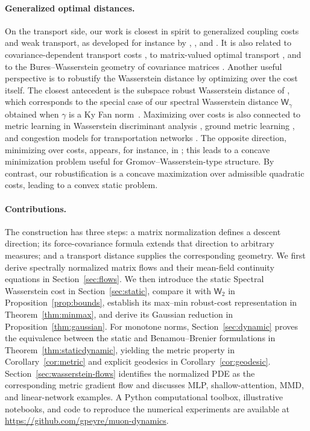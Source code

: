 \documentclass{article}
\newcommand{\Wtwo}{\mathsf{W}_2}
\newcommand{\Wg}{\mathsf{W}_{\gamma}}
\begin{document}
\paragraph{Generalized optimal distances.}
On the transport side, our work is closest in spirit to generalized coupling costs and weak transport, as developed for instance by \citet{GozlanRobertoSamsonTetali2017}, \citet{BackhoffBeiglbockPammer2019}, and \citet{BackhoffPammer2022}. It is also related to covariance-dependent transport costs \citep{BurgerErbarHoffmannMatthesSchlichting2023}, to matrix-valued optimal transport \citep{NingGeorgiouTannenbaum2015,ChenGeorgiouTannenbaum2018}, and to the Bures--Wasserstein geometry of covariance matrices \citep{BhatiaJainLim2019}. Another useful perspective is to robustify the Wasserstein distance by optimizing over the cost itself. 
%
The closest antecedent is the subspace robust Wasserstein distance of \citet{PatyCuturi2019}, which corresponds to the special case of our spectral Wasserstein distance $\Wg$ obtained when $\gamma$ is a Ky Fan norm~\citep{fan1951maximum}.
%
Maximizing over costs is also connected to metric learning in Wasserstein discriminant analysis \citep{FlamaryCuturiCourtyRakotomamonjy2018}, ground metric learning \citep{CuturiAvis2014}, and congestion models for transportation networks \citep{CarlierJimenezSantambrogio2008}. The opposite direction, minimizing over costs, appears, for instance, in \citet{SebbouhCuturiPeyre2023}; this leads to a concave minimization problem useful for Gromov--Wasserstein-type structure. By contrast, our robustification is a concave maximization over admissible quadratic costs, leading to a convex static problem.

\paragraph{Contributions.}
The construction has three steps: a matrix normalization defines a descent
direction; its force-covariance formula extends that direction to arbitrary
measures; and a transport distance supplies the corresponding geometry.
We first derive spectrally normalized matrix flows and their mean-field
continuity equations in Section~\ref{sec:flows}. We then introduce the static
Spectral Wasserstein cost in Section~\ref{sec:static}, compare it with $\Wtwo$
in Proposition~\ref{prop:bounds}, establish its max--min robust-cost
representation in Theorem~\ref{thm:minmax}, and derive its Gaussian reduction
in Proposition~\ref{thm:gaussian}. For monotone norms,
Section~\ref{sec:dynamic} proves the equivalence between the static and
Benamou--Brenier formulations in Theorem~\ref{thm:staticdynamic}, yielding the
metric property in Corollary~\ref{cor:metric} and explicit geodesics in
Corollary~\ref{cor:geodesic}. Section~\ref{sec:wasserstein-flows} identifies the
normalized PDE as the corresponding metric gradient flow and discusses MLP,
shallow-attention, MMD, and linear-network examples. A Python computational
toolbox, illustrative notebooks, and code to reproduce the numerical
experiments are available at
\url{https://github.com/gpeyre/muon-dynamics}.
\end{document}
